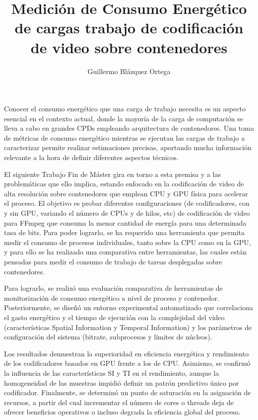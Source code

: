 \documentclass[twoside,english,a4paper,12pt]{plantilla/twcam-tfm-doc}
\title{Medición de Consumo Energético de cargas trabajo de codificación de video sobre contenedores}
\author{Guillermo Blázquez Ortega}
\begin{document}
\portada
\declaracion
\clearpage


\begin{resumen}
  Conocer el consumo energético que una carga de trabajo necesita es un aspecto esencial en el contexto actual, donde la mayoría de la carga de computación se lleva a cabo en grandes CPDs empleando arquitectura de contenedores. Una toma de métricas de consumo energético mientras se ejecutan las cargas de trabajo a caracterizar permite realizar estimaciones precisas, aportando mucha información relevante a la hora de definir diferentes aspectos técnicos. 
  
  El siguiente Trabajo Fin de Máster gira en torno a esta premisa y a las problemáticas que ello implica, estando enfocado en la codificación de video de alta resolución sobre contenedores que emplean CPU y GPU física para acelerar el proceso. El objetivo es probar diferentes configuraciones (de codificadores, con y sin GPU, variando el número de CPUs y de hilos, etc) de codificación de video para FFmpeg que consuma la menor cantidad de energía para una determinada tasa de bits. Para poder lograrlo, se ha requerido una herramienta que permita medir el consumo de procesos individuales, tanto sobre la CPU como en la GPU, y para ello se ha realizado una comparativa entre herramientas, las cuales están pensadas para medir el consumo de trabajo de tareas desplegadas sobre contenedores.

  Para lograrlo, se realizó una evaluación comparativa de herramientas de monitorización de consumo energético a nivel de proceso y contenedor. Posteriormente, se diseñó un entorno experimental automatizado que correlaciona el gasto energético y el tiempo de ejecución con la complejidad del video (características Spatial Information y Temporal Information) y los parámetros de configuración del sistema (bitrate, subprocesos y límites de núcleos).

  Los resultados demuestran la superioridad en eficiencia energética y rendimiento de los codificadores basados en GPU frente a los de CPU. Asimismo, se confirmó la influencia de las características SI y TI en el rendimiento, aunque la homogeneidad de las muestras impidió definir un patrón predictivo único por codificador. Finalmente, se determinó un punto de saturación en la asignación de recursos, a partir del cual incrementar el número de cores o threads deja de ofrecer beneficios operativos o incluso degrada la eficiencia global del proceso.
  
\end{resumen}
\clearpage
\end{document}
